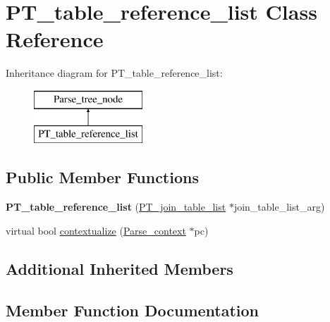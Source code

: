 \hypertarget{classPT__table__reference__list}{}\section{P\+T\+\_\+table\+\_\+reference\+\_\+list Class Reference}
\label{classPT__table__reference__list}
Inheritance diagram for P\+T\+\_\+table\+\_\+reference\+\_\+list\+:\begin{figure}[H]
\begin{center}
\leavevmode
\includegraphics[height=2.000000cm]{classPT__table__reference__list}
\end{center}
\end{figure}
\subsection*{Public Member Functions}
\begin{DoxyCompactItemize}
\item 
\mbox{\label{classPT__table__reference__list_a9f33257fa1b568f02a0a31114dd2598b}} 
{\bfseries P\+T\+\_\+table\+\_\+reference\+\_\+list} (\mbox{\hyperlink{classPT__join__table__list}{P\+T\+\_\+join\+\_\+table\+\_\+list}} $\ast$join\+\_\+table\+\_\+list\+\_\+arg)
\item 
virtual bool \mbox{\hyperlink{classPT__table__reference__list_a55453eb9047372140e7232f4c208f6cc}{contextualize}} (\mbox{\hyperlink{structParse__context}{Parse\+\_\+context}} $\ast$pc)
\end{DoxyCompactItemize}
\subsection*{Additional Inherited Members}


\subsection{Member Function Documentation}
\mbox{\label{classPT__table__reference__list_a55453eb9047372140e7232f4c208f6cc}} 
